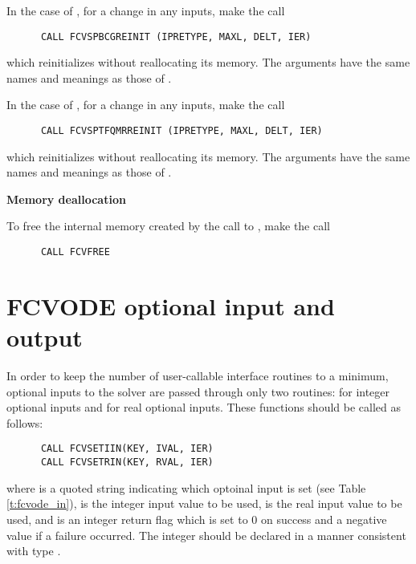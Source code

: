 \begin{Steps}
  In the case of {\spbcg}, for a change in any inputs, make the call
\begin{verbatim}
      CALL FCVSPBCGREINIT (IPRETYPE, MAXL, DELT, IER)
\end{verbatim}
  which reinitializes {\spbcg} without reallocating its memory.
  The arguments have the same names and meanings as those of .

  In the case of {\sptfqmr}, for a change in any inputs, make the call
\begin{verbatim}
      CALL FCVSPTFQMRREINIT (IPRETYPE, MAXL, DELT, IER)
\end{verbatim}
  which reinitializes {\sptfqmr} without reallocating its memory.
  The arguments have the same names and meanings as those of .


\item {\bf Memory deallocation}

  To free the internal memory created by the call to ,
  make the call
\begin{verbatim}
      CALL FCVFREE
\end{verbatim}

\end{Steps}


\section{FCVODE optional input and output}\label{fcv_opt_inout}

In order to keep the number of user-callable {\fcvode} interface routines to
a minimum, optional inputs to the {\cvode} solver are passed through only
two routines:  for integer optional inputs and 
for real optional inputs. These functions should be called as follows:
\begin{verbatim}
      CALL FCVSETIIN(KEY, IVAL, IER)
      CALL FCVSETRIN(KEY, RVAL, IER)
\end{verbatim}
where  is a quoted string indicating which optoinal input is set
(see Table \ref{t:fcvode_in}),
 is the integer input value to be used,
 is the real input value to be used, and
 is an integer return flag which is set to $0$ on success and 
a negative value if a failure occurred.
The integer  should be declared in a manner consistent with {\CC}
type .

